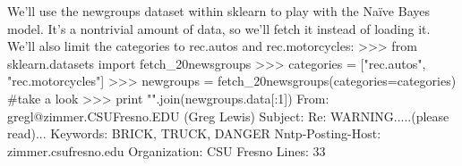 We'll use the newgroups dataset within sklearn to play with the Naïve Bayes model. It's a
nontrivial amount of data, so we'll fetch it instead of loading it. We'll also limit the categories
to rec.autos and rec.motorcycles:
>>> from sklearn.datasets import fetch_20newsgroups
>>> categories = ["rec.autos", "rec.motorcycles"]
>>> newgroups = fetch_20newsgroups(categories=categories)
#take a look
>>> print "\n".join(newgroups.data[:1])
From: gregl@zimmer.CSUFresno.EDU (Greg Lewis)
Subject: Re: WARNING.....(please read)...
Keywords: BRICK, TRUCK, DANGER
Nntp-Posting-Host: zimmer.csufresno.edu
Organization: CSU Fresno
Lines: 33






















